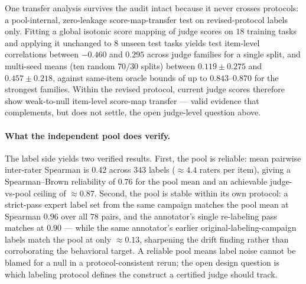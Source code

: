 \documentclass{article}
\begin{document}
One transfer analysis survives the audit intact because it never crosses protocols: a pool-internal, zero-leakage score-map-transfer test on revised-protocol labels only.
Fitting a global isotonic score mapping of judge scores on \(18\) training tasks and applying it unchanged to \(8\) unseen test tasks yields test item-level correlations between \(-0.460\) and \(0.295\) across judge families for a single split, and multi-seed means (ten random \(70/30\) splits) between \(0.119 \pm 0.275\) and \(0.457 \pm 0.218\), against same-item oracle bounds of up to \(0.843\)--\(0.870\) for the strongest families.
Within the revised protocol, current judge scores therefore show weak-to-null item-level score-map transfer --- valid evidence that complements, but does not settle, the open judge-level question above.

\paragraph{What the independent pool does verify.}
The label side yields two verified results.
First, the pool is reliable: mean pairwise inter-rater Spearman is \(0.42\) across \(343\) labels (\(\approx 4.4\) raters per item), giving a Spearman--Brown reliability of \(0.76\) for the pool mean and an achievable judge-vs-pool ceiling of \(\approx 0.87\).
Second, the pool is stable within its own protocol: a strict-pass expert label set from the same campaign matches the pool mean at Spearman \(0.96\) over all \(78\) pairs, and the annotator's single re-labeling pass matches at \(0.90\) --- while the same annotator's earlier original-labeling-campaign labels match the pool at only \(\approx 0.13\), sharpening the drift finding rather than corroborating the behavioral target.
A reliable pool means label noise cannot be blamed for a null in a protocol-consistent rerun; the open design question is which labeling protocol defines the construct a certified judge should track.
\end{document}
